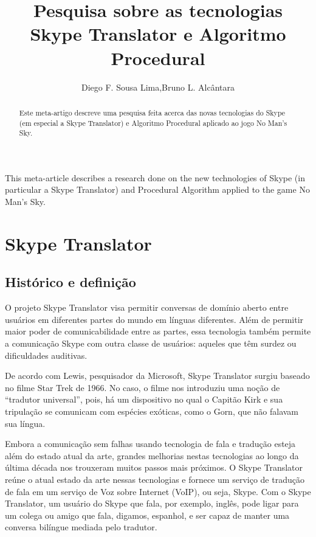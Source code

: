 \documentclass[12pt]{article}
\title{Pesquisa sobre as tecnologias Skype Translator e Algoritmo Procedural}
\author{Diego F. Sousa Lima\inst{1},Bruno L. Alcântara\inst{1} }
\begin{document}
 

\maketitle

\begin{abstract}
  Este meta-artigo descreve uma pesquisa feita acerca das novas tecnologias do Skype (em especial a Skype Translator) e Algoritmo Procedural aplicado ao jogo No Man’s Sky.
\end{abstract}
     
\begin{resumo} 
 This meta-article describes a research done on the new technologies of Skype (in particular a Skype Translator) and Procedural Algorithm applied to the game No Man's Sky.
\end{resumo}


\section{Skype Translator}

\subsection{Histórico e definição}

O projeto Skype Translator visa permitir conversas de domínio aberto entre usuários em diferentes partes do mundo em línguas diferentes. Além de permitir maior poder de comunicabilidade entre as partes, essa tecnologia também permite a comunicação Skype com outra classe de usuários: aqueles que têm surdez ou dificuldades auditivas.

De acordo com Lewis, pesquisador da Microsoft, Skype Translator surgiu baseado no filme Star Trek de 1966. No caso, o filme nos introduziu uma noção de “tradutor universal”, pois, há um dispositivo no qual o Capitão Kirk e sua tripulação se comunicam com espécies exóticas, como o Gorn, que não falavam sua língua.

Embora a comunicação sem falhas usando tecnologia de fala e tradução esteja além do estado atual da arte, grandes melhorias nestas tecnologias ao longo da última década nos trouxeram muitos passos mais próximos. O  Skype Translator reúne o atual estado da arte nessas tecnologias e fornece um serviço de tradução de fala em um serviço de Voz sobre Internet (VoIP), ou seja, Skype.
Com o Skype Translator, um usuário do Skype que fala, por exemplo, inglês, pode ligar para um colega ou amigo que fala, digamos, espanhol, e ser capaz de manter uma conversa bilíngue mediada pelo tradutor.
\end{document}
